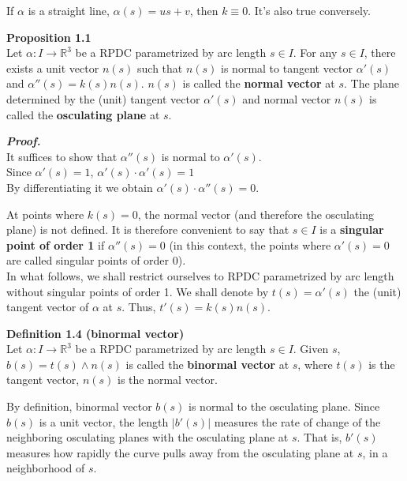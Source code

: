 \documentclass{article}
\begin{document}
\par
If $\alpha$ is a straight line, $\alpha(s) = us + v$, then $k \equiv 0$. It's also true conversely.

\par
\textbf{Proposition 1.1}\\
Let $\alpha: I \to \mathbb R^3$ be a RPDC parametrized by arc length $s \in I$. For any $s \in I$,
there exists a unit vector $n(s)$ such that $n(s)$ is normal to tangent vector $\alpha'(s)$ and
$\alpha''(s) = k(s)n(s)$. $n(s)$ is called the \textbf{normal vector} at $s$. The plane determined by the
(unit) tangent vector $\alpha'(s)$ and normal vector $n(s)$ is called the \textbf{osculating plane} at $s$.

\par
\textbf{\textit{Proof.}}\\
It suffices to show that $\alpha''(s)$ is normal to $\alpha'(s)$.\\
Since $\alpha'(s) = 1$, $\alpha'(s) \cdot \alpha'(s) = 1$\\
By differentiating it we obtain $\alpha'(s) \cdot \alpha''(s) = 0$.

\par
At points where $k(s) = 0$, the normal vector (and therefore the osculating plane) is not defined. It is
therefore convenient to say that $s \in I$ is a \textbf{singular point of order 1} if $\alpha''(s) = 0$ 
(in this context, the points where $\alpha'(s) = 0$ are called singular points of order 0).\\
In what follows, we shall restrict ourselves to RPDC parametrized by arc length without singular points
of order 1. We shall denote by $t(s) = \alpha'(s)$ the (unit) tangent vector of $\alpha$ at $s$. Thus,
$t'(s) = k(s)n(s)$.

\par
\textbf{Definition 1.4 (binormal vector)}\\
Let $\alpha: I \to \mathbb R^3$ be a RPDC parametrized by arc length $s \in I$. Given $s$, 
$b(s) = t(s) \land n(s)$ is called the \textbf{binormal vector} at $s$, where $t(s)$ is the tangent vector, 
$n(s)$ is the normal vector. 

\par
By definition, binormal vector $b(s)$ is normal to the osculating plane. Since $b(s)$ is a unit vector,
the length $|b'(s)|$ measures the rate of change of the neighboring osculating planes with the osculating
plane at $s$. That is, $b'(s)$ measures how rapidly the curve pulls away from the osculating plane at $s$,
in a neighborhood of $s$.
\end{document}
